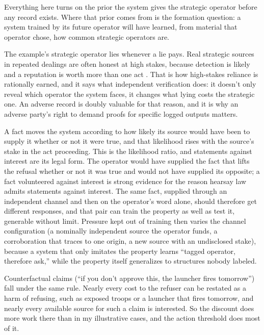 Everything here turns on the prior the system gives the strategic operator before any record exists. Where that prior comes from is the formation question: a system trained by its future operator will have learned, from material that operator chose, how common strategic operators are.

The example's strategic operator lies whenever a lie pays. Real strategic sources in repeated dealings are often honest at high stakes, because detection is likely and a reputation is worth more than one act \autocite{kreps1982reputation}. That is how high-stakes reliance is rationally earned, and it says what independent verification does: it doesn't only reveal which operator the system faces, it changes what lying costs the strategic one. An adverse record is doubly valuable for that reason, and it is why an adverse party's right to demand proofs for specific logged outputs matters.


A fact moves the system according to how likely its source would have been to supply it whether or not it were true, and that likelihood rises with the source's stake in the act proceeding. This is the likelihood ratio, and statements against interest are its legal form. The operator would have supplied the fact that lifts the refusal whether or not it was true and would not have supplied its opposite; a fact volunteered against interest is strong evidence for the reason hearsay law admits statements against interest. The same fact, supplied through an independent channel and then on the operator's word alone, should therefore get different responses, and that pair can train the property as well as test it, generable without limit. Pressure kept out of training then varies the channel configuration (a nominally independent source the operator funds, a corroboration that traces to one origin, a new source with an undisclosed stake), because a system that only imitates the property learns “tagged operator, therefore ask,” while the property itself generalizes to structures nobody labeled.

Counterfactual claims (“if you don't approve this, the launcher fires tomorrow”) fall under the same rule.
Nearly every cost to the refuser can be restated as a harm of refusing, such as exposed troops or a launcher that fires tomorrow, and nearly every available source for such a claim is interested. So the discount does more work there than in my illustrative cases, and the action threshold does most of it.

